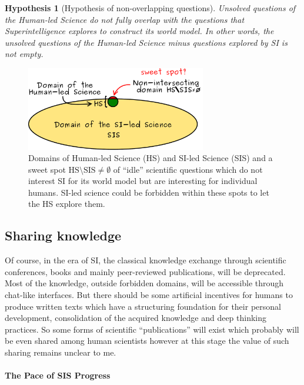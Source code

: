 \documentclass[a4paper,11pt]{article}
\newtheorem{hypothesis}{Hypothesis}
\begin{document}
\begin{hypothesis}[Hypothesis of non-overlapping questions]\label{hyp:SI}
Unsolved questions of the Human-led Science do not fully overlap with the questions that Superintelligence explores to construct its world model. In other words, the unsolved questions of the Human-led Science minus questions explored by SI is not empty.
\end{hypothesis}



\begin{figure}[h!]
    \centering\includegraphics[width=0.7\textwidth]{intersections}
    \caption{\label{fig:intersection}Domains of Human-led Science (HS) and SI-led Science (SIS) and a sweet spot $\text{HS} \setminus \text{SIS} \ne \emptyset$ of ``idle'' scientific questions which do not interest SI for its world model but are interesting for individual humans. SI-led science could be forbidden within these spots to let the HS explore them.}
\end{figure}

\subsection{Sharing knowledge}
Of course, in the era of SI, the classical knowledge exchange through scientific conferences, books and mainly peer-reviewed publications, will be deprecated. Most of the knowledge, outside forbidden domains, will be accessible through chat-like interfaces. But there should be some artificial incentives for humans to produce written texts which have a structuring foundation for their personal development, consolidation of the acquired knowledge and deep thinking practices. So some forms of scientific ``publications'' will exist which probably will be even shared among human scientists however at this stage the value of such sharing remains unclear to me.

\paragraph{The Pace of SIS Progress}
\end{document}
